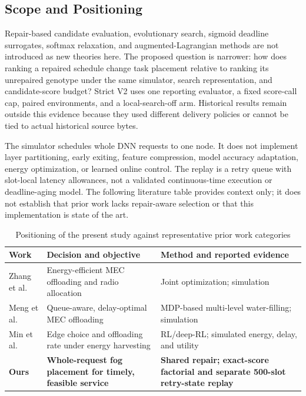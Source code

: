 \documentclass[pdflatex,sn-mathphys-num]{sn-jnl}
\begin{document}
\subsection{Scope and Positioning}
Repair-based candidate evaluation, evolutionary search, sigmoid deadline surrogates, softmax relaxation, and augmented-Lagrangian methods are not introduced as new theories here. The proposed question is narrower: how does ranking a repaired schedule change task placement relative to ranking its unrepaired genotype under the same simulator, search representation, and candidate-score budget? Strict V2 uses one reporting evaluator, a fixed score-call cap, paired environments, and a local-search-off arm. Historical results remain outside this evidence because they used different delivery policies or cannot be tied to actual historical source bytes.

The simulator schedules whole DNN requests to one node. It does not implement layer partitioning, early exiting, feature compression, model accuracy adaptation, energy optimization, or learned online control. The replay is a retry queue with slot-local latency allowances, not a validated continuous-time execution or deadline-aging model. The following literature table provides context only; it does not establish that prior work lacks repair-aware selection or that this implementation is state of the art.

\begin{table}[t]
\caption{Positioning of the present study against representative prior work categories}
\label{tab:related_work}
\centering
\small
\setlength{\tabcolsep}{2pt}
\begin{tabular}{>{\raggedright\arraybackslash}p{}>{\raggedright\arraybackslash}p{}>{\raggedright\arraybackslash}p{}}
\toprule
\textbf{Work} & \textbf{Decision and objective} & \textbf{Method and reported evidence} \\
\midrule
Zhang et al. \cite{Zhang2016} & Energy-efficient MEC offloading and radio allocation & Joint optimization; simulation \\
Meng et al. \cite{Meng2019} & Queue-aware, delay-optimal MEC offloading & MDP-based multi-level water-filling; simulation \\
Min et al. \cite{Min2019} & Edge choice and offloading rate under energy harvesting & RL/deep-RL; simulated energy, delay, and utility \\
\textbf{Ours} & \textbf{Whole-request fog placement for timely, feasible service} & \textbf{Shared repair; exact-score factorial and separate 500-slot retry-state replay} \\
\bottomrule
\end{tabular}
\end{table}
\end{document}
